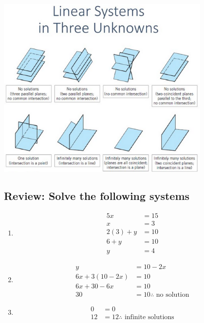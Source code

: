 \documentclass[
  letterpaper,
  DIV=11,
  numbers=noendperiod]{scrartcl}
\begin{document}
\begin{center}
\includegraphics[width=0.8\textwidth,height=\textheight]{img/linearsystems.png}
\end{center}

\hypertarget{review-solve-the-following-systems}{%
\subsection{Review: Solve the following
systems}\label{review-solve-the-following-systems}}

\begin{enumerate}
\def\labelenumi{\arabic{enumi}.}
\item

  \begin{align*}
  5x &= 15 \\
  x &= 3 \\
  2(3)+y &= 10 \\
  6 + y &= 10 \\
  y &= 4
  \end{align*}
\item

  \begin{align*}
  y &= 10-2x \\
  6x + 3(10-2x) &= 10 \\
  6x + 30 - 6x &= 10 \\
  30 &= 10 \therefore \text { no solution}
  \end{align*}
\item

  \begin{align*}
  0 &= 0 \\
  12 &= 12 \therefore \text{ infinite solutions}
  \end{align*}
\end{enumerate}
\end{document}
